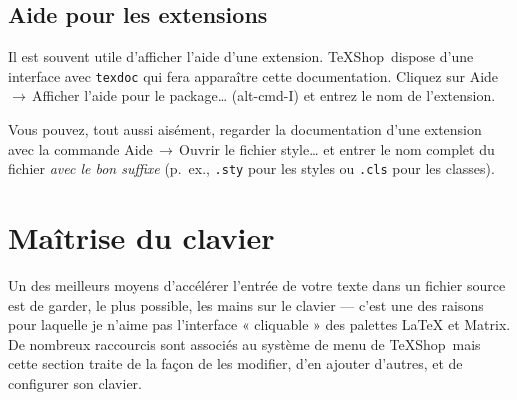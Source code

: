 \documentclass[11pt,french]{article}
\newcommand{\TS}{\textsf{\TeX Shop}}
\newcommand{\cmd}[1]{\textsf{#1}}
\newcommand{\mnu}[1]{\textsf{#1}}
\newcommand{\To}{\,\(\to\)\,}
\begin{document}

\subsection{Aide pour les extensions}

Il est souvent utile d'afficher l'aide d'une extension. \TS\ dispose d'une interface avec \texttt{texdoc} qui fera apparaître cette documentation. Cliquez sur \mnu{Aide}\To\mnu{Afficher l'aide pour le package…} (\cmd{alt-cmd-I}) et entrez le nom de l'extension.

Vous pouvez, tout aussi aisément, regarder la documentation d'une extension avec la commande \mnu{Aide}\To\mnu{Ouvrir le fichier style…} et entrer le nom complet du fichier \emph{avec le bon suffixe} (p.~ex., \texttt{.sty} pour les styles ou \texttt{.cls} pour les classes).

%


\section{Maîtrise du clavier}

Un des meilleurs moyens d'accélérer l'entrée de votre texte dans un fichier source est de garder, le plus possible, les mains sur le clavier --- c'est une des raisons pour laquelle je n'aime pas l'interface « cliquable » des palettes LaTeX et Matrix. De nombreux raccourcis sont associés au système de menu de \TS\ mais cette section traite de la façon de les modifier, d'en ajouter d'autres, et de configurer son clavier.
\end{document}
